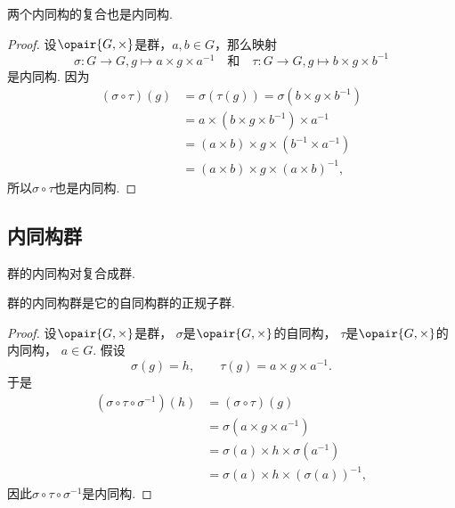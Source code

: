 \begin{theorem}
两个内同构的复合也是内同构.
\begin{proof}
设\(\opair{G,\times}\)是群，\(a,b\in G\)，那么映射\[
	\sigma\colon G\to G, g\mapsto a\times g\times a^{-1}
	\quad\text{和}\quad
	\tau\colon G\to G, g\mapsto b\times g\times b^{-1}
\]是内同构.
因为\begin{align*}
	(\sigma\circ\tau)(g)
	&=\sigma(\tau(g))
	=\sigma(b\times g\times b^{-1}) \\
	&=a\times(b\times g\times b^{-1})\times a^{-1} \\
	&=(a\times b)\times g\times(b^{-1}\times a^{-1}) \\
	&=(a\times b)\times g\times(a\times b)^{-1},
\end{align*}
所以\(\sigma\circ\tau\)也是内同构.
\end{proof}
\end{theorem}

\subsection{内同构群}
\begin{theorem}
群的内同构对复合成群.
\end{theorem}

\begin{theorem}
群的内同构群是它的自同构群的正规子群.
\begin{proof}
设\(\opair{G,\times}\)是群，
\(\sigma\)是\(\opair{G,\times}\)的自同构，
\(\tau\)是\(\opair{G,\times}\)的内同构，
\(a\in G\).
假设\[
	\sigma(g)=h, \qquad
	\tau(g)=a\times g\times a^{-1}.
\]
于是\begin{align*}
	(\sigma\circ\tau\circ\sigma^{-1})(h)
	&= (\sigma\circ\tau)(g) \\
	&= \sigma(a\times g\times a^{-1}) \\
	&= \sigma(a)\times h\times\sigma(a^{-1}) \\
	&= \sigma(a)\times h\times(\sigma(a))^{-1},
\end{align*}
因此\(\sigma\circ\tau\circ\sigma^{-1}\)是内同构.
\end{proof}
\end{theorem}
